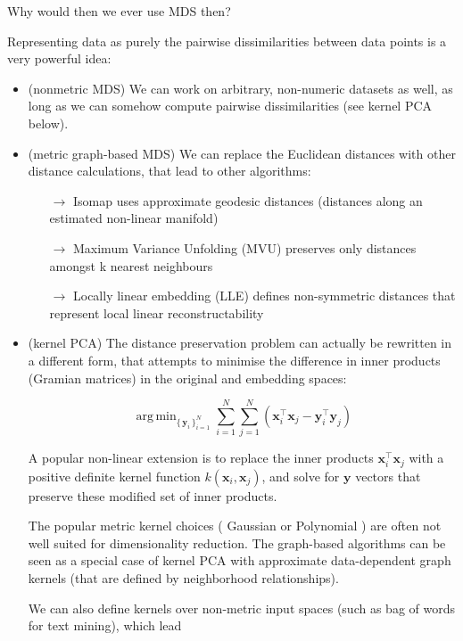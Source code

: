 \documentclass[11pt]{article}
\DeclareMathOperator*{\argmin}{arg\,min}
\begin{document}
\begin{tcolorbox}[title=MDS advantages]

Why would then we ever use MDS then?

\vspace{0.5cm}
 
Representing data as purely the pairwise dissimilarities between data points is a very powerful idea:

\begin{itemize}
	\item  (nonmetric MDS) We can work on arbitrary, non-numeric datasets as well, as long as we can somehow compute pairwise dissimilarities (see kernel PCA below). 
	\item (metric graph-based MDS) We can replace the Euclidean distances with other distance calculations, that lead to other algorithms:
	\begin{itemize}
		\item[$\rightarrow$] Isomap uses approximate geodesic distances (distances along an estimated non-linear manifold)
		\item[$\rightarrow$] Maximum Variance Unfolding (MVU) preserves only distances amongst k nearest neighbours%
		\item[$\rightarrow$] Locally linear embedding (LLE) defines non-symmetric distances that represent local linear reconstructability  %
	\end{itemize} 
	\item (kernel PCA) The distance preservation problem can actually be rewritten in a different form, that attempts to minimise the difference in inner products (Gramian matrices) in the original and embedding spaces:
	
	$$ \argmin_{\{\, \mathbf{y}_i\, \}_{i=1}^N} \sum_{i=1}^N\sum_{j=1}^N (\mathbf{x}_i^\top \mathbf{x}_j - \mathbf{y}_i^\top \mathbf{y}_j ) $$
	
	A popular non-linear extension is to replace the inner products $\mathbf{x}_i^\top \mathbf{x}_j$ with a positive definite kernel function $k(\mathbf{x}_i, \mathbf{x}_j)$, and solve for $\mathbf{y}$ vectors that preserve these modified set of inner products. 
	
	\vspace{0.5cm}
	The popular metric kernel choices ( Gaussian or Polynomial ) are often not well suited for dimensionality reduction. The graph-based algorithms can be seen as a special case of kernel PCA with approximate data-dependent graph kernels (that are defined by neighborhood relationships).
	
	\vspace{0.5cm}
	We can also define kernels over non-metric input spaces (such as bag of words for text mining), which lead 
	
	
\end{itemize}

\end{tcolorbox}
\end{document}
